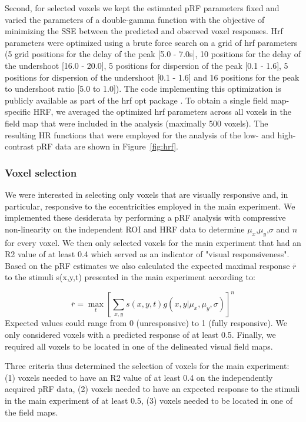 Second, for selected voxels we kept the estimated pRF parameters fixed and varied the parameters of a double-gamma function with the objective of minimizing the SSE between the predicted and observed voxel responses. Hrf parameters were optimized using a brute force search on a grid of hrf parameters (5 grid positions for the delay of the peak [5.0 - 7.0s], 10 positions for the delay of the undershoot [16.0 - 20.0], 5 positions for dispersion of the peak [0.1 - 1.6], 5 positions for dispersion of the undershoot [0.1 - 1.6] and 16 positions for the peak to undershoot ratio [5.0 to 1.0]). The code implementing this optimization is publicly available as part of the hrf opt package \parencite{hrf_opt}. To obtain a single field map-specific HRF, we averaged the optimized hrf parameters across all voxels in the field map that were included in the analysis (maximally 500 voxels). The resulting HR functions that were employed for the analysis of the low- and high-contrast pRF data are shown in Figure~\ref{fig:hrf}.

\subsubsection{Voxel selection}
We were interested in selecting only voxels that are visually responsive and, in particular, responsive to the eccentricities employed in the main experiment. We implemented these desiderata by performing a pRF analysis with compressive non-linearity on the independent ROI and HRF data to determine $\mu_x$,$\mu_y$,$\sigma$ and $n$ for every voxel. We then only selected voxels for the main experiment that had an R2 value of at least 0.4 which served as an indicator of "visual responsiveness". Based on the pRF estimates we also calculated the expected maximal response $\overline{r}$ to the stimuli s(x,y,t) presented in the main experiment according to:

\begin{equation}
\overline{r} = \max_t [\sum_{x,y} s(x,y,t) g(x, y|\mu_x,\mu_y,\sigma)]^n
\end{equation}
Expected values could range from 0 (unresponsive) to 1 (fully responsive). We only considered voxels with a predicted response of at least 0.5. Finally, we required all voxels to be located in one of the delineated visual field maps.

Three criteria thus determined the selection of voxels for the main experiment: (1) voxels needed to have an R2 value of at least 0.4 on the independently acquired pRF data, (2) voxels needed to have an expected response to the stimuli in the main experiment of at least 0.5, (3) voxels needed to be located in one of the field maps.

